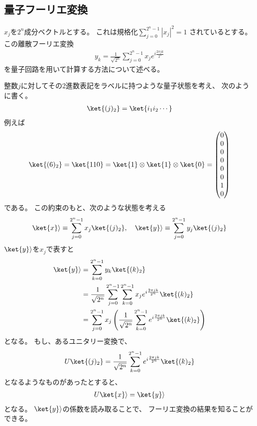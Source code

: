 \documentclass[]{ltjsarticle}
\begin{document}
\subsection{量子フーリエ変換}
$x_j$を$2^n$成分ベクトルとする。
これは規格化$\sum_{j=0}^{2^n-1} |x_j|^2 = 1$
されているとする。
この離散フーリエ変換
\begin{align}
    y_k 
    = 
    \frac{1}{\sqrt{2^n}}
    \sum_{j=0}^{2^n-1} x_j e^{i\frac{2\pi jk}{2^n}}
\end{align}
を量子回路を用いて計算する方法について述べる。

整数$j$に対してその2進数表記をラベルに持つような量子状態を考え、
次のように書く。
\begin{align}
    \ket{(j)_2} = \ket{i_1 i_2 \cdots}
\end{align}
例えば
\begin{align}
    \ket{(6)_2} 
    = 
    \ket{110} 
    = 
    \ket{1} \otimes \ket{1} \otimes \ket{0} 
    =
    \begin{pmatrix}
        0 \\ 0 \\ 0 \\ 0 \\ 0 \\ 0 \\ 1 \\ 0
    \end{pmatrix}
\end{align}
である。
この約束のもと、次のような状態を考える
\begin{align}
    \ket{x}\rangle 
    \equiv 
    \sum_{j=0}^{2^n-1} x_j \ket{(j)_2}, \quad
    \ket{y}\rangle 
    \equiv 
    \sum_{j=0}^{2^n-1} y_j \ket{(j)_2}
\end{align}
$\ket{y}\rangle$を$x_j$で表すと
\begin{align}
    \ket{y}\rangle 
    &=
    \sum_{k=0}^{2^n-1} y_k \ket{(k)_2} \\
    &=
    \frac{1}{\sqrt{2^n}}
    \sum_{j=0}^{2^n-1}     
    \sum_{k=0}^{2^n-1}
    x_j e^{i\frac{2\pi jk}{2^n}}
    \ket{(k)_2} \\
    &=
    \sum_{j=0}^{2^n-1}     
    x_j
    \left(
        \frac{1}{\sqrt{2^n}}
        \sum_{k=0}^{2^n-1}
        e^{i\frac{2\pi jk}{2^n}}
        \ket{(k)_2}    
    \right)
\end{align}
となる。
もし、あるユニタリー変換で、
\begin{align}
    U \ket{(j)_2}
    =
    \frac{1}{\sqrt{2^n}}
    \sum_{k=0}^{2^n-1}
    e^{i\frac{2\pi jk}{2^n}}
    \ket{(k)_2}    
\end{align}
となるようなものがあったとすると、
\begin{align}
    U \ket{x}\rangle 
    =
    \ket{y}\rangle
\end{align}
となる。
$\ket{y}\rangle$の係数を読み取ることで、
フーリエ変換の結果を知ることができる。
\end{document}
